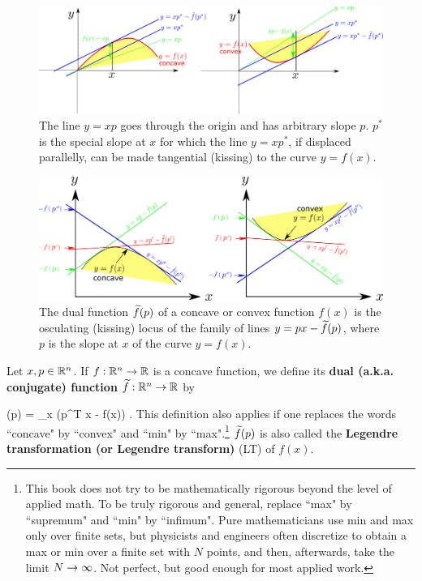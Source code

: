 \begin{figure}[h!]
\centering
\includegraphics[width=6in]
{conventions/dual-fun-detail.png}
\caption{The line
$y=xp$ goes through the
origin and has arbitrary slope 
$p$. $p^*$ is 
the special slope 
at $x$
for which the line
$y=xp^*$,
if
displaced parallelly,
can be made tangential (kissing)
to
the curve $y=f(x)$.}
\label{fig-dual-fun-detail}
\end{figure}

\begin{figure}[h!]
\centering
\includegraphics[width=6in]
{conventions/dual-fun.png}
\caption{The dual
function ${\widetilde{f}}(p)$ of a concave or convex function
$f(x)$
is the osculating (kissing)
locus of the 
family
of lines $y=px - {\widetilde{f}}(p)$,
where $p$
is the slope at $x$ 
of the curve $y=f(x)$.}
\label{fig-dual-fun}
\end{figure}

Let $x,p\in{ \mathbb{R}}^n$.
If $f:{ \mathbb{R}}^n\rightarrow { \mathbb{R}}$ is a concave function, we
define its {\bf dual (a.k.a.
conjugate) function} 
${\widetilde{f}}:{ \mathbb{R}}^n\rightarrow { \mathbb{R}}$ by

\beq
{}(p) = \min_x (p^T x - f(x))
\label{eq-Fp-def}
\;.
\eeq
This definition also applies if
one replaces the words ``concave" 
by ``convex" and
``min" by ``max".\footnote{This 
book does not try to be
mathematically rigorous
beyond the level
of applied math. To be truly
rigorous and general,
replace ``max" by ``supremum"
and ``min" by ``infimum".
Pure mathematicians use
min and max 
only over finite sets,
but physicists and engineers 
often discretize to obtain 
a max or min  over a finite
set with $N$ points,
and then, afterwards,
take the limit $N\rightarrow\infty$.
Not perfect, but good enough
for most applied work. }
${\widetilde{f}}(p)$
is also called the 
{\bf Legendre transformation (or
Legendre transform)} (LT)
of $f(x)$.

